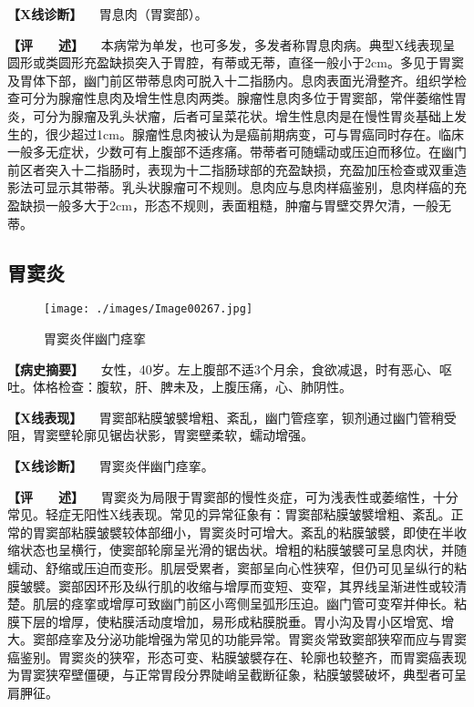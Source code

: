 \textbf{【X线诊断】} 　胃息肉（胃窦部）。

\textbf{【评　　述】}
　本病常为单发，也可多发，多发者称胃息肉病。典型X线表现呈圆形或类圆形充盈缺损突入于胃腔，有蒂或无蒂，直径一般小于2cm。多见于胃窦及胃体下部，幽门前区带蒂息肉可脱入十二指肠内。息肉表面光滑整齐。组织学检查可分为腺瘤性息肉及增生性息肉两类。腺瘤性息肉多位于胃窦部，常伴萎缩性胃炎，可分为腺瘤及乳头状瘤，后者可呈菜花状。增生性息肉是在慢性胃炎基础上发生的，很少超过1cm。腺瘤性息肉被认为是癌前期病变，可与胃癌同时存在。临床一般多无症状，少数可有上腹部不适疼痛。带蒂者可随蠕动或压迫而移位。在幽门前区者突入十二指肠时，表现为十二指肠球部的充盈缺损，充盈加压检查或双重造影法可显示其带蒂。乳头状腺瘤可不规则。息肉应与息肉样癌鉴别，息肉样癌的充盈缺损一般多大于2cm，形态不规则，表面粗糙，肿瘤与胃壁交界欠清，一般无蒂。

\subsection{胃窦炎}

\begin{figure}[!htbp]
 \centering
 \texttt{[image: ./images/Image00267.jpg]}
 \captionsetup{justification=centering}
 \caption{胃窦炎伴幽门痉挛}
 \label{fig5-3-6}
  \end{figure} 

\textbf{【病史摘要】}
　女性，40岁。左上腹部不适3个月余，食欲减退，时有恶心、呕吐。体格检查：腹软，肝、脾未及，上腹压痛，心、肺阴性。

\textbf{【X线表现】}
　胃窦部粘膜皱襞增粗、紊乱，幽门管痉挛，钡剂通过幽门管稍受阻，胃窦壁轮廓见锯齿状影，胃窦壁柔软，蠕动增强。

\textbf{【X线诊断】} 　胃窦炎伴幽门痉挛。

\textbf{【评　　述】}
　胃窦炎为局限于胃窦部的慢性炎症，可为浅表性或萎缩性，十分常见。轻症无阳性X线表现。常见的异常征象有：胃窦部粘膜皱襞增粗、紊乱。正常的胃窦部粘膜皱襞较体部细小，胃窦炎时可增大。紊乱的粘膜皱襞，即使在半收缩状态也呈横行，使窦部轮廓呈光滑的锯齿状。增粗的粘膜皱襞可呈息肉状，并随蠕动、舒缩或压迫而变形。肌层受累者，窦部呈向心性狭窄，但仍可见呈纵行的粘膜皱襞。窦部因环形及纵行肌的收缩与增厚而变短、变窄，其界线呈渐进性或较清楚。肌层的痉挛或增厚可致幽门前区小弯侧呈弧形压迫。幽门管可变窄并伸长。粘膜下层的增厚，使粘膜活动度增加，易形成粘膜脱垂。胃小沟及胃小区增宽、增大。窦部痉挛及分泌功能增强为常见的功能异常。胃窦炎常致窦部狭窄而应与胃窦癌鉴别。胃窦炎的狭窄，形态可变、粘膜皱襞存在、轮廓也较整齐，而胃窦癌表现为胃窦狭窄壁僵硬，与正常胃段分界陡峭呈截断征象，粘膜皱襞破坏，典型者可呈肩胛征。

